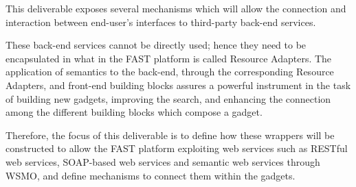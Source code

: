 \documentclass{article}
\begin{document}
This deliverable exposes several mechanisms which will allow the connection and interaction between end-user's interfaces to third-party back-end services.

These back-end services cannot be directly used; hence they need to be encapsulated in what in the FAST platform is called Resource Adapters. The application of semantics to the back-end, through the corresponding Resource Adapters, and front-end building blocks assures a powerful instrument in the task of building new gadgets, improving the search, and enhancing the connection among the different building blocks which compose a gadget.

Therefore, the focus of this deliverable is to define how these wrappers will be constructed to allow the FAST platform exploiting web services \cite{GustavoAlonso2003} such as RESTful web services, SOAP-based web services and semantic web services through WSMO, and define mechanisms to connect them within the gadgets.

\newpage


\clearpage
\end{document}
